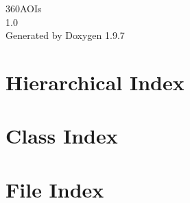 \documentclass[twoside]{book}
\newcommand{\+}{\discretionary{\mbox{\scriptsize$\hookleftarrow$}}{}{}}
\newcommand{\clearemptydoublepage}{%
    \newpage{\pagestyle{empty}\cleardoublepage}%
  }
\begin{document}
  \raggedbottom
    \hypersetup{pageanchor=false,
                bookmarksnumbered=true,
                pdfencoding=unicode
               }
  \begin{titlepage}
  \vspace*{7cm}
  \begin{center}%
  {\Large 360\+AOIs}\\
  [1ex]\large 1.\+0 \\
  \vspace*{1cm}
  {\large Generated by Doxygen 1.9.7}\\
  \end{center}
  \end{titlepage}
  \clearemptydoublepage
  \tableofcontents
  \clearemptydoublepage
  \hypersetup{pageanchor=true}
\chapter{Hierarchical Index}

\chapter{Class Index}

\chapter{File Index}

\end{document}
